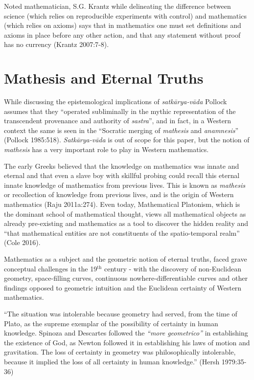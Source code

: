 Noted mathematician, S.G. Krantz while delineating the difference between science (which relies on reproducible experiments with control) and mathematics (which relies on axioms) says that in mathematics one must set definitions and axioms in place before any other action, and that any statement without proof has no currency (Krantz 2007:7-8).\\[-20pt]

\section*{Mathesis and Eternal Truths}

While discussing the epistemological implications of {\sl satkārya-vāda} Pollock assumes that they ``operated subliminally in the mythic representation of the transcendent provenance and authority of {\sl sastra}'', and in fact, in a Western context the same is seen in the ``Socratic merging of {\sl mathesis} and {\sl anamnesis}'' (Pollock 1985:518). {\sl Satkārya-vāda} is out of scope for this paper, but the notion of {\sl mathesis} has a very important role to play in Western mathematics. 

The early Greeks believed that the knowledge on mathematics was innate and eternal and that even a slave boy with skillful probing could recall this eternal innate knowledge of mathematics from previous lives. This is known as {\sl mathesis} or recollection of knowledge from previous lives, and is the origin of Western mathematics (Raju 2011a:274). Even today, Mathematical Platonism, which is the dominant school of mathematical thought, views all mathematical objects as already pre-existing and mathematics as a tool to discover the hidden reality and “that mathematical entities are not constituents of the spatio-temporal realm” (Cole 2016). 

Mathematics as a subject and the geometric notion of eternal truths, faced grave conceptual challenges in the 19$^{\text{th}}$ century - with the discovery of non-Euclidean geometry, space-filling curves, continuous nowhere-differentiable curves and other findings opposed to geometric intuition and the Euclidean certainty of Western mathematics.
\begin{myquote}
``The situation was intolerable because geometry had served, from the time of Plato, as the supreme exemplar of the possibility of certainty in human knowledge. Spinoza and Descartes followed the {\sl``more geometrico''} in establishing the existence of God, as Newton followed it in establishing his laws of motion and gravitation. The loss of certainty in geometry was philosophically intolerable, because it implied the loss of all certainty in human knowledge.''	
\hfill (Hersh 1979:35-36)
\end{myquote}

